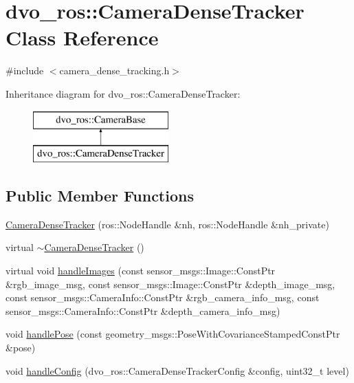 \hypertarget{classdvo__ros_1_1_camera_dense_tracker}{}\section{dvo\+\_\+ros\+:\+:Camera\+Dense\+Tracker Class Reference}
\label{classdvo__ros_1_1_camera_dense_tracker}


{\ttfamily \#include $<$camera\+\_\+dense\+\_\+tracking.\+h$>$}

Inheritance diagram for dvo\+\_\+ros\+:\+:Camera\+Dense\+Tracker\+:\begin{figure}[H]
\begin{center}
\leavevmode
\includegraphics[height=2.000000cm]{classdvo__ros_1_1_camera_dense_tracker}
\end{center}
\end{figure}
\subsection*{Public Member Functions}
\begin{DoxyCompactItemize}
\item 
\mbox{\hyperlink{classdvo__ros_1_1_camera_dense_tracker_a85604036a34ea68a29dc80a3ea782ee7}{Camera\+Dense\+Tracker}} (ros\+::\+Node\+Handle \&nh, ros\+::\+Node\+Handle \&nh\+\_\+private)
\item 
virtual \mbox{\hyperlink{classdvo__ros_1_1_camera_dense_tracker_ae8ab4b242a3149461825976d4d310aaf}{$\sim$\+Camera\+Dense\+Tracker}} ()
\item 
virtual void \mbox{\hyperlink{classdvo__ros_1_1_camera_dense_tracker_ad1b549d802d0ebc3627603b3f9ef03b4}{handle\+Images}} (const sensor\+\_\+msgs\+::\+Image\+::\+Const\+Ptr \&rgb\+\_\+image\+\_\+msg, const sensor\+\_\+msgs\+::\+Image\+::\+Const\+Ptr \&depth\+\_\+image\+\_\+msg, const sensor\+\_\+msgs\+::\+Camera\+Info\+::\+Const\+Ptr \&rgb\+\_\+camera\+\_\+info\+\_\+msg, const sensor\+\_\+msgs\+::\+Camera\+Info\+::\+Const\+Ptr \&depth\+\_\+camera\+\_\+info\+\_\+msg)
\item 
void \mbox{\hyperlink{classdvo__ros_1_1_camera_dense_tracker_a385c851351c4ab22240409d2d340344f}{handle\+Pose}} (const geometry\+\_\+msgs\+::\+Pose\+With\+Covariance\+Stamped\+Const\+Ptr \&pose)
\item 
void \mbox{\hyperlink{classdvo__ros_1_1_camera_dense_tracker_a7fce574520d9ca9056636506db504912}{handle\+Config}} (dvo\+\_\+ros\+::\+Camera\+Dense\+Tracker\+Config \&config, uint32\+\_\+t level)
\end{DoxyCompactItemize}
